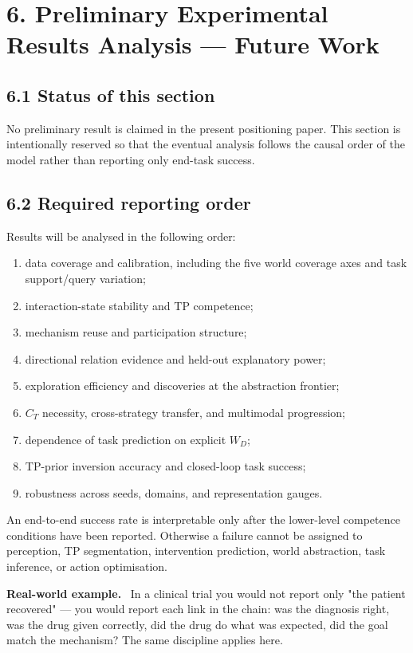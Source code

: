 \documentclass[11pt]{article}
\newenvironment{example}{%
  \par\smallskip\noindent\begin{minipage}{\textwidth}%
  \color{teal!60!black}\small
  \textbf{\color{teal!70!black}Real-world example.}\
}{%
  \end{minipage}\par\smallskip}
\begin{document}
\section*{6. Preliminary Experimental Results Analysis --- Future Work}

\subsection*{6.1 Status of this section}

No preliminary result is claimed in the present positioning paper. This section is intentionally reserved so that the eventual
analysis follows the causal order of the model rather than reporting only end-task success.

\subsection*{6.2 Required reporting order}

Results will be analysed in the following order:

\begin{enumerate}
\item data coverage and calibration, including the five world coverage axes and task support/query variation;
\item interaction-state stability and TP competence;
\item mechanism reuse and participation structure;
\item directional relation evidence and held-out explanatory power;
\item exploration efficiency and discoveries at the abstraction frontier;
\item $C_T$ necessity, cross-strategy transfer, and multimodal progression;
\item dependence of task prediction on explicit $W_D$;
\item TP-prior inversion accuracy and closed-loop task success;
\item robustness across seeds, domains, and representation gauges.
\end{enumerate}

An end-to-end success rate is interpretable only after the lower-level competence conditions have been reported. Otherwise a failure
cannot be assigned to perception, TP segmentation, intervention prediction, world abstraction, task inference, or action optimisation.

\begin{example}
In a clinical trial you would not report only "the patient recovered" --- you would report each link in the chain: was the diagnosis
right, was the drug given correctly, did the drug do what was expected, did the goal match the mechanism? The same discipline applies
here.
\end{example}
\end{document}
